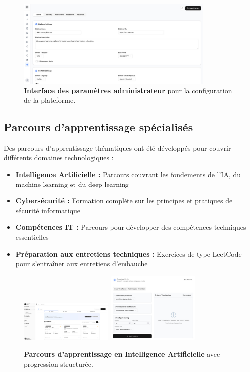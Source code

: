 \begin{figure}[h!]
  \centering
  \includegraphics[width=0.85\textwidth,keepaspectratio]{old-reports/week_4_img/settings_admin.jpeg}
  \caption{\textbf{Interface des paramètres administrateur} pour la configuration de la plateforme.}
  \label{fig:admin_settings}
\end{figure}

\subsection{Parcours d'apprentissage spécialisés}

Des parcours d'apprentissage thématiques ont été développés pour couvrir différents domaines technologiques :

\begin{itemize}
  \item \textbf{Intelligence Artificielle :} Parcours couvrant les fondements de l'IA, du machine learning et du deep learning
  \item \textbf{Cybersécurité :} Formation complète sur les principes et pratiques de sécurité informatique
  \item \textbf{Compétences IT :} Parcours pour développer des compétences techniques essentielles
  \item \textbf{Préparation aux entretiens techniques :} Exercices de type LeetCode pour s'entraîner aux entretiens d'embauche
\end{itemize}

\begin{figure}[h!]
  \centering
  \includegraphics[width=0.4\textwidth,keepaspectratio]{old-reports/week_4_img/ai_1.jpeg}
  \includegraphics[width=0.4\textwidth,keepaspectratio]{old-reports/week_4_img/ai_2.jpeg}
  \caption{\textbf{Parcours d'apprentissage en Intelligence Artificielle} avec progression structurée.}
  \label{fig:ai_learning_path}
\end{figure}

